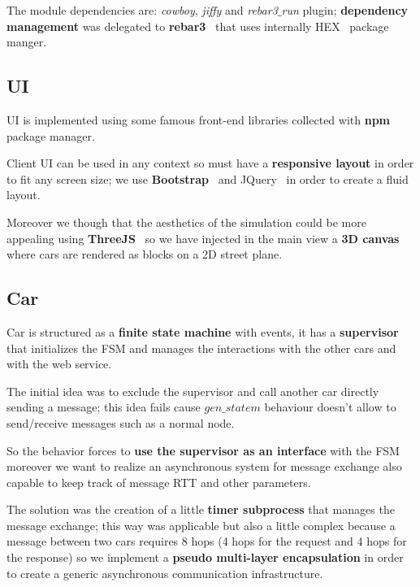 The module dependencies are: \textit{cowboy}, \textit{jiffy} and \textit{rebar3$\_$run} 
plugin; \textbf{dependency management} was delegated to \textbf{rebar3}~\cite{17} 
that uses internally HEX~\cite{18} package manger.


\subsection{UI}

UI is implemented using some famous front-end libraries collected with 
\textbf{npm}~\cite{16} package manager. 

Client UI can be used in any context so must have a \textbf{responsive layout} in order 
to fit any screen size; we use \textbf{Bootstrap}~\cite{19} and JQuery~\cite{20} 
in order to create a fluid layout. 

Moreover we though that the aesthetics of the simulation could be more appealing 
using \textbf{ThreeJS}~\cite{21} so we have injected in the main view a \textbf{3D canvas} 
where cars are rendered as blocks on a 2D street plane.


\subsection{Car}

Car is structured as a \textbf{finite state machine} with events, 
it has a \textbf{supervisor} that initializes the FSM and manages the interactions 
with the other cars and with the web service. 

The initial idea was to exclude the supervisor and call another car directly sending 
a message; this idea fails cause $gen\_statem$ behaviour doesn't allow to send/receive 
messages such as a normal node. 

So the behavior forces to \textbf{use the supervisor as an interface} with the FSM 
moreover we want to realize an asynchronous system for message exchange also 
capable to keep track of message RTT and other parameters. 

The solution was the creation of a little \textbf{timer subprocess} that manages the 
message exchange; this way was applicable but also a little complex because 
a message between two cars requires 8 hops (4 hops for the request and 4 hops for 
the response) so we implement a \textbf{pseudo multi-layer encapsulation} in order 
to create a generic asynchronous communication infrastructure.    


